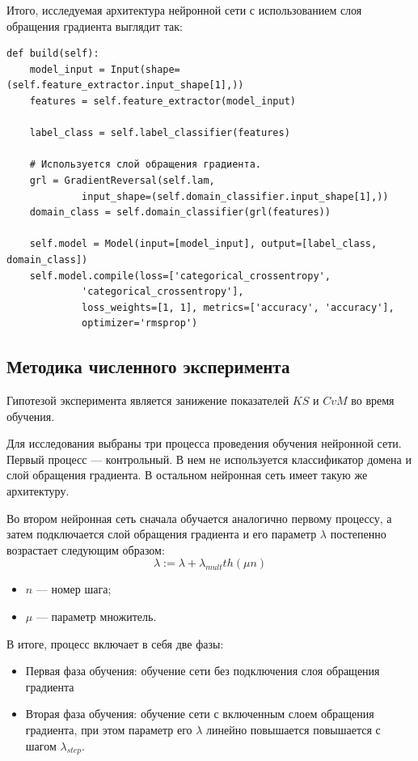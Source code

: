\documentclass[14pt, a4paper]{extarticle}
\begin{document}
Итого, исследуемая архитектура нейронной сети с использованием слоя обращения градиента выглядит так:
\begin{verbatim}
def build(self):
    model_input = Input(shape=(self.feature_extractor.input_shape[1],))
    features = self.feature_extractor(model_input)

    label_class = self.label_classifier(features)

    # Используется слой обращения градиента.
    grl = GradientReversal(self.lam, 
             input_shape=(self.domain_classifier.input_shape[1],))
    domain_class = self.domain_classifier(grl(features))

    self.model = Model(input=[model_input], output=[label_class, domain_class])
    self.model.compile(loss=['categorical_crossentropy', 
             'categorical_crossentropy'],
             loss_weights=[1, 1], metrics=['accuracy', 'accuracy'],
             optimizer='rmsprop')
\end{verbatim}

\subsection*{Методика численного эксперимента}

Гипотезой эксперимента является занижение показателей $KS$ и $CvM$ во время обучения.

Для исследования выбраны три процесса проведения обучения нейронной сети.
Первый процесс — контрольный. В нем не используется классификатор домена и слой обращения градиента. В остальном нейронная сеть имеет такую же архитектуру.

Во втором нейронная сеть сначала обучается аналогично первому процессу, а затем подключается слой обращения градиента и его параметр $\lambda$ постепенно возрастает следующим образом:
\begin{equation*}
	\lambda := \lambda + \lambda_{mult} th(\mu n)
\end{equation*}
\begin{itemize}
	\item $n$ — номер шага;
	\item $\mu$ — параметр множитель.
\end{itemize}

В итоге, процесс включает в себя две фазы:
\begin{itemize}
	\item Первая фаза обучения: обучение сети без подключения слоя обращения градиента
	\item Вторая фаза обучения: обучение сети с включенным слоем обращения градиента, при этом параметр его $\lambda$ линейно повышается повышается с шагом $\lambda_{step}$.
\end{itemize}
\end{document}
